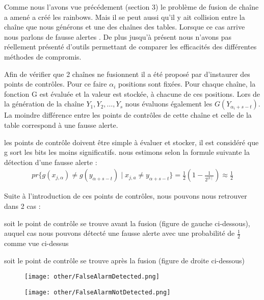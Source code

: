 	Comme nous l'avons vue précédement (section 3) le problème de fusion de chaîne a amené a créé les \glspl{rainbow}. Mais il se peut aussi qu'il y ait collision entre la chaîne que nous générons et une des chaînes des tables. Lorsque ce cas arrive nous parlons de fausse alertes \cite{checkpoints}.
	De plus jusqu'à présent nous n'avons pas réellement présenté d'outils permettant de comparer les efficacités des différentes méthodes de compromis.

	Afin de vérifier que 2 chaînes ne fusionnent il a été proposé par \cite{checkpoints} d'instaurer des points de contrôles. Pour ce faire $\alpha_i$ positions sont fixées. Pour chaque chaîne, la fonction G est évaluée et la valeur est stockée, à chacune de ces positions. Lors de la génération de la chaîne $Y_1,Y_2,\ldots{},Y_s$ nous évaluons également les $G(Y_{\alpha_i+s-t})$. La moindre différence entre les points de contrôles de cette chaîne et celle de la table correspond à une fausse alerte.


	\bigskip
	
	les points de contrôle doivent être simple à évaluer et stocker, il est considéré que g sort les bits les moins significatifs. nous estimons selon la formule suivante la détection d'une fausse alerte :
\begin{align*}
pr\{g(x_{j,\alpha}) \neq g(y_{\alpha +s-t}) \mid x_{j,a} \neq y_{\alpha+s-t}\}=\frac{1}{2}(1-\frac{1}{2^{\mid k \mid}}) \approx \frac{1}{2}
\end{align*}

	Suite à l'introduction de ces points de contrôles, nous pouvons nous retrouver dans 2 cas :
	\bi
\item soit le point de contrôle se trouve avant la fusion (figure de gauche ci-dessous), auquel cas nous pouvons détecté une fausse alerte avec une probabilité de $\frac{1}{2}$ comme vue ci-dessus
\item soit le point de contrôle se trouve après la fusion (figure de droite ci-dessous)
	\ei

\begin{figure}[h!]
	\begin{minipage}{.5\textwidth}
		\texttt{[image: other/FalseAlarmDetected.png]}
	\end{minipage}
	\begin{minipage}{.5\textwidth}
	    \texttt{[image: other/FalseAlarmNotDetected.png]}
  	\end{minipage}
\end{figure}

